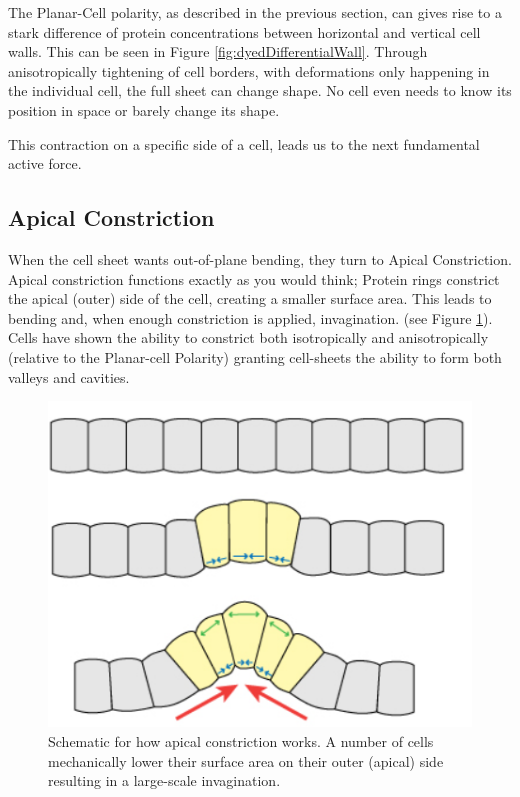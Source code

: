 The Planar-Cell polarity, as described in the previous section, can gives rise to a stark difference of protein concentrations between horizontal and vertical cell walls. This can be seen in Figure \ref{fig:dyedDifferentialWall}.
Through anisotropically tightening of cell borders, with deformations only happening in the individual cell, the full sheet can change shape. No cell even needs to know its position in space or barely change its shape. 

This contraction on a specific side of a cell, leads us to the next fundamental active force.



\subsection{ Apical Constriction }
\label{sec:ApicalConstriction}
When the cell sheet wants out-of-plane bending, they turn to Apical Constriction. Apical constriction functions exactly as you would think; Protein rings constrict the apical (outer) side of the cell, creating a smaller surface area. This leads to bending and, when enough constriction is applied, invagination. (see Figure \ref{fig:apical-constriction}). Cells have shown the ability to constrict both isotropically and anisotropically (relative to the Planar-cell Polarity) granting cell-sheets the ability to form both valleys and cavities.

\begin{figure}[H]
    \centering
    \includegraphics[width=0.4\linewidth]{chapters/Theory/figures/apical_constriction_schematic.png}
    \caption{Schematic for how apical constriction works. A number of cells mechanically lower their surface area on their outer (apical) side resulting in a large-scale invagination.} 
    \label{fig:apical-constriction}
\end{figure}


